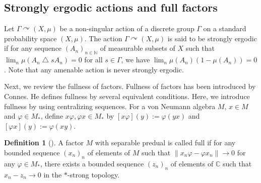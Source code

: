 \documentclass{amsart}
\newcommand{\R}{\mathcal{R}}
\renewcommand{\phi}{\varphi}
\theoremstyle{remark}
\theoremstyle{definition}
\newtheorem*{definition}{Definition}
\begin{document}

\subsection{Strongly ergodic actions and full factors}\label{stronglyergodic}
Let $\Gamma \curvearrowright (X, \mu)$ be a non-singular action of a discrete group $\Gamma$ on a standard probability space $(X, \mu)$.
The action $\Gamma \curvearrowright (X, \mu)$ is said to be strongly ergodic if for any sequence $(A_n)_{n \in \mathbb{N}}$ of measurable subsets of $X$ such that $\lim _n \mu (A_n \bigtriangleup s A_n) = 0$ for all $s \in \Gamma$, we have $\lim_n \mu (A_n) (1- \mu (A_n)) = 0$.
Note that any amenable action is never strongly ergodic.

Next, we review the fullness of factors.
Fullness of factors has been introduced by Connes.
He defines fullness by several equivalent conditions.
Here, we introduce fullness by using centralizing sequences.
For a von Neumann algebra $M$, $x \in M$ and $\varphi \in M_*$, define $x \varphi, \varphi x \in M_*$ by $[x \varphi](y) := \varphi (yx)$ and $[\varphi x] (y) := \varphi (xy)$.

\begin{definition}[\cite{Connes}]
A factor $M$ with separable predual is called full if for any bounded sequence $(x_n)_n$ of elements of $M$ such that $\| x_n \varphi - \varphi x_n \| \to 0$ for any $\varphi \in M_*$, there exists a bounded sequence $(z_n)_n$ of elements of $\mathbb{C}$ such that $x_n - z_n \to 0$ in the $*$-strong topology.
\end{definition}
\end{document}
